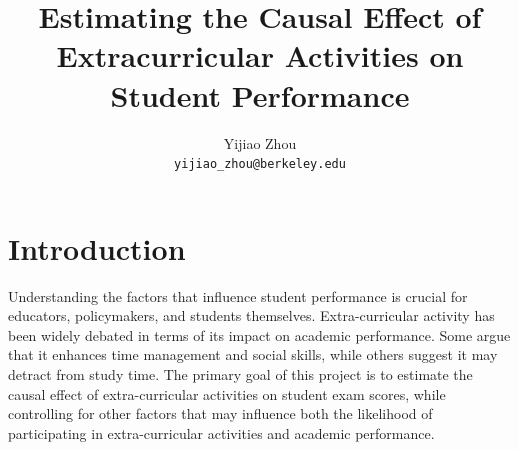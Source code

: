 \documentclass[10pt,letterpaper]{article}
\title{Estimating the Causal Effect of Extracurricular Activities on Student Performance}
\author{Yijiao Zhou\\ \texttt{yijiao\_zhou@berkeley.edu}}
\date{}
\begin{document}
\maketitle



\section{Introduction}

Understanding the factors that influence student performance is crucial for educators, policymakers, and students themselves. Extra-curricular activity has been widely debated in terms of its impact on academic performance. Some argue that it enhances time management and social skills, while others suggest it may detract from study time. The primary goal of this project is to estimate the causal effect of extra-curricular activities on student exam scores, while controlling for other factors that may influence both the likelihood of participating in extra-curricular activities and academic performance.
\end{document}
